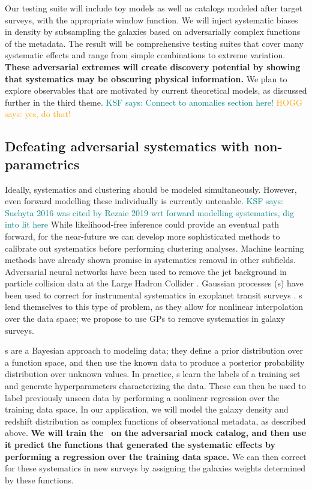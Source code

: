 \documentclass[12pt, fullpage, letterpaper]{article}
\newcommand{\KSF}[1]{\textcolor{teal}{KSF says: #1}}
\newcommand{\HOGG}[1]{\textcolor{orange}{HOGG says: #1}}
\begin{document}
Our testing suite will include toy models as well as catalogs modeled after target surveys, with the appropriate window function.
We will inject systematic biases in density by subsampling the galaxies based on adversarially complex functions of the metadata.
The result will be comprehensive testing suites that cover many systematic effects and range from simple combinations to extreme variation.
\textbf{These adversarial extremes will create discovery potential by showing that systematics may be obscuring physical information.}
We plan to explore observables that are motivated by current theoretical models, as discussed further in the third theme. \KSF{Connect to anomalies section here!} \HOGG{yes, do that!}

\subsection{Defeating adversarial systematics with non-parametrics}

Ideally, systematics and clustering should be modeled simultaneously. 
However, even forward modelling these individually is currently untenable. \KSF{Suchyta 2016 was cited by Rezaie 2019 wrt forward modelling systematics, dig into lit here} 
While likelihood-free inference could provide an eventual path forward, for the near-future we can develop more sophisticated methods to calibrate out systematics before performing clustering analyses.
Machine learning methods have already shown promise in systematics removal in other subfields.
Adversarial neural networks have been used to remove the jet background in particle collision data at the Large Hadron Collider \citep{Shimmin2017}.
Gaussian processes (\GP s) have been used to correct for instrumental systematics in exoplanet transit surveys \citep{Gibson2012, Aigrain2016}. 
\GP s lend themselves to this type of problem, as they allow for nonlinear interpolation over the data space; we propose to use GPs to remove systematics in galaxy surveys.

\GP s are a Bayesian approach to modeling data; they define a prior distribution over a function space, and then use the known data to produce a posterior probability distribution over unknown values. 
In practice, \GP s learn the labels of a training set and generate hyperparameters characterizing the data.
These can then be used to label previously unseen data by performing a nonlinear regression over the training data space.
In our application, we will model the galaxy density and redshift distribution as complex functions of observational metadata, as described above.
\textbf{We will train the \GP\ on the adversarial mock catalog, and then use it predict the functions that generated the systematic effects by performing a regression over the training data space.}
We can then correct for these systematics in new surveys by assigning the galaxies weights determined by these functions.
\end{document}
